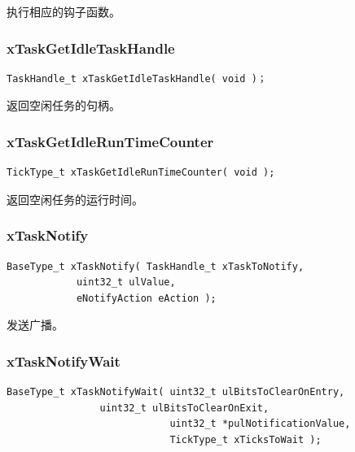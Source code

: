 \documentclass[12pt, a4paper]{article}
\begin{document}
执行相应的钩子函数。

\subsubsection {xTaskGetIdleTaskHandle}

\begin{lstlisting}[language={[ANSI]C},keywordstyle=\color{blue!70},commentstyle=\color{red!50!green!50!blue!50},frame=shadowbox, rulesepcolor=\color{red!20!green!20!blue!20}]
TaskHandle_t xTaskGetIdleTaskHandle( void )；
\end{lstlisting}

返回空闲任务的句柄。

\subsubsection {xTaskGetIdleRunTimeCounter}

\begin{lstlisting}[language={[ANSI]C},keywordstyle=\color{blue!70},commentstyle=\color{red!50!green!50!blue!50},frame=shadowbox, rulesepcolor=\color{red!20!green!20!blue!20}]
TickType_t xTaskGetIdleRunTimeCounter( void );
\end{lstlisting}

返回空闲任务的运行时间。

\subsubsection {xTaskNotify}

\begin{lstlisting}[language={[ANSI]C},keywordstyle=\color{blue!70},commentstyle=\color{red!50!green!50!blue!50},frame=shadowbox, rulesepcolor=\color{red!20!green!20!blue!20}]
BaseType_t xTaskNotify( TaskHandle_t xTaskToNotify, 
			uint32_t ulValue, 
			eNotifyAction eAction );
\end{lstlisting}

发送广播。

\subsubsection {xTaskNotifyWait}
\begin{lstlisting}[language={[ANSI]C},keywordstyle=\color{blue!70},commentstyle=\color{red!50!green!50!blue!50},frame=shadowbox, rulesepcolor=\color{red!20!green!20!blue!20}]
BaseType_t xTaskNotifyWait( uint32_t ulBitsToClearOnEntry, 
			    uint32_t ulBitsToClearOnExit, 
                            uint32_t *pulNotificationValue, 
                            TickType_t xTicksToWait );
\end{lstlisting}
\end{document}
